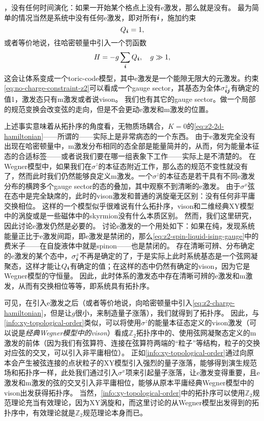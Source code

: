 ，没有任何时间演化：如果一开始某个格点上没有e激发，那么就是没有。
最为简单的情况当然是系统中没有任何e激发，即对所有$\vb*{i}$，施加约束
\begin{equation}
    Q_{\vb*{i}} = 1,
    \label{eq:no-charge-constraint-z2}
\end{equation}
或者等价地说，往哈密顿量中引入一个罚函数
\begin{equation}
    H = - g \sum_{\vb*{i}} Q_{\vb*{i}} , \quad g \gg 1,
    \label{eq:z2-charge-hamiltonian}
\end{equation}
这会让体系变成一个toric-code模型，其中e激发是一个能隙无限大的元激发。约束\eqref{eq:no-charge-constraint-z2}可以看成一个gauge sector，其基态为全体$\sigma^z_{\vb*{i} \vb*{j}}$有确定的值1，激发态只有m激发或者说vison。
我们也有其它的gauge sector。做一个局部的规范变换会改变弦的走向，但是不会更动e激发和m激发的位置。

上述事实意味着从拓扑序的角度看，无物质场耦合，$K=0$的\eqref{eq:z2-2d-hamiltonian}——所谓的——实际上是非常病态的一个东西。
由于e激发完全没有出现在哈密顿量中，m激发分布相同的态全部是能量简并的，从而，何为能量本征态的合适标签——或者说我们要在哪一组表象下工作——实际上是不清楚的。
在Wegner模型中，如果我们在$\sigma^z$的本征态附近工作，那么态的规范不变性就没有了，然而此时我们仍然能够良定义m激发。一个$\sigma^z$的本征态是若干具有不同e激发分布的横跨多个gauge sector的态的叠加，其中观察不到清晰的e激发。
由于$\sigma^x$弦在态中是完全缺席的，此时的vison激发和普通的涡旋毫无区别：没有任何非平庸交换相位。
这样的一个模型似乎很难说有什么拓扑序，vison和二维经典XY模型中的涡旋或是一些磁体中的skyrmion没有什么本质区别。
然而，我们这里研究，因此讨论e激发仍然是必要的。
讨论e激发的一个用处如下：如果在纯，发现系统能量正比于e激发间距，即e激发是禁闭的，那么\eqref{eq:z2-spin-liquid-ising-gauge}中的费米子——在自旋液体中就是spinon——也是禁闭的。
存在清晰可辨、分布确定的e激发的某个态中，$\sigma^z_{\vb*{i}}$不再是确定的了，于是实际上此时系统基态是一个弦网凝聚态，这样才能让$Q_{\vb*{i}}$有确定的值；在这样的态中仍然有确定的vison，因为它是Wegner模型的守恒量。
因此，此时体系的激发态中存在清晰可辨的e激发和m激发，从而有交换相位等等，即系统具有拓扑序。

可见，在引入e激发之后（或者等价地说，向哈密顿量中引入\eqref{eq:z2-charge-hamiltonian}，但是让$g$很小，来制造量子涨落），我们就得到了拓扑序。
因此，与\autoref{info:xy-topological-order}类似，可以将使用$\sigma^z$的能量本征态定义的vison激发（可以说是\emph{经典Wegner模型中的vison}）看成$\mathbb{Z}_2$拓扑序中的、使用弦网凝聚态定义的m激发的前体（因为我们有弦算符、连接在弦算符两端的“粒子”等结构，粒子的交换对应弦的交叉，可以引入非平庸相位）。
正如\autoref{info:xy-topological-order}通过向原本会产生被弦连接的点状粒子的XY模型引入强烈的量子涨落，能够得到演生规范场和拓扑序一样，此处我们通过引入$\sigma^x$项来引起量子涨落，让e激发变得重要，且e激发和m激发的弦的交叉引入非平庸相位，能够从原本平庸经典Wegner模型中的vison出发获得拓扑序。
当然，\autoref{info:xy-topological-order}中的拓扑序可以使用$\mathbb{Z}_2$规范理论充当有效理论，因为XY涡旋和，而这里讨论的从Wegner模型出发得到的拓扑序中，有效理论就是$\mathbb{Z}_2$规范理论本身而已。

